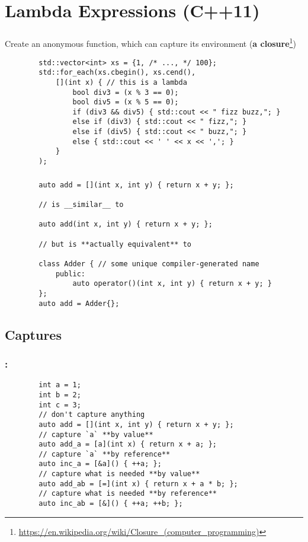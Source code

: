 \documentclass[aspectratio=43, t]{beamer}
\begin{document}
\section*{Lambda Expressions (C++11)}
\begin{frame}[fragile]
	\frametitle{\secname\footnotemark[1]{}}

	Create an anonymous function, which can capture its environment (\textbf{a closure}\footnote[2]{\url{https://en.wikipedia.org/wiki/Closure_(computer_programming)}})
	\begin{verbatim}
		std::vector<int> xs = {1, /* ..., */ 100};
		std::for_each(xs.cbegin(), xs.cend(),
			[](int x) { // this is a lambda
				bool div3 = (x % 3 == 0);
				bool div5 = (x % 5 == 0);
				if (div3 && div5) { std::cout << " fizz buzz,"; }
				else if (div3) { std::cout << " fizz,"; }
				else if (div5) { std::cout << " buzz,"; }
				else { std::cout << ' ' << x << ','; }
			}
		);
	\end{verbatim}
\end{frame}

\begin{frame}[fragile]
	\frametitle{\secname}

	\begin{verbatim}
		auto add = [](int x, int y) { return x + y; };

		// is __similar__ to

		auto add(int x, int y) { return x + y; };

		// but is **actually equivalent** to

		class Adder { // some unique compiler-generated name
			public:
				auto operator()(int x, int y) { return x + y; }
		};
		auto add = Adder{};
	\end{verbatim}
\end{frame}

\subsection*{Captures}
\begin{frame}[fragile]
	\frametitle{\secname: \subsecname\footnotemark[1]{}}

	\begin{verbatim}
		int a = 1;
		int b = 2;
		int c = 3;
		// don't capture anything
		auto add = [](int x, int y) { return x + y; };
		// capture `a` **by value**
		auto add_a = [a](int x) { return x + a; };
		// capture `a` **by reference**
		auto inc_a = [&a]() { ++a; };
		// capture what is needed **by value**
		auto add_ab = [=](int x) { return x + a * b; };
		// capture what is needed **by reference**
		auto inc_ab = [&]() { ++a; ++b; };
	\end{verbatim}
\end{frame}
\end{document}
